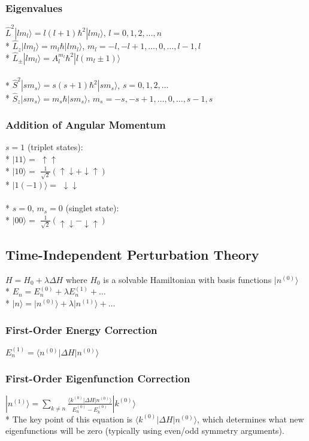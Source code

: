\subsubsection{Eigenvalues}
\(\hat{L}^2|lm_l\rangle=l(l+1)\hbar^2|lm_l\rangle\), \(l=0,1,2,\ldots,n\)\\*
\(\hat{L}_z|lm_l\rangle=m_l\hbar|lm_l\rangle\), \(m_l=-l,-l+1,\ldots,0,\ldots,l-1,l\)\\*
\(\hat{L}_\pm|lm_l\rangle=A_l^{m_l}\hbar^2|l(m_l\pm 1)\rangle\)\\\\*
\(\hat{S}^2|sm_s\rangle=s(s+1)\hbar^2|sm_s\rangle\), \(s=0,1,2,\ldots\)\\*
\(\hat{S}_z|sm_s\rangle=m_s\hbar|sm_s\rangle\), \(m_s=-s,-s+1,\ldots,0,\ldots,s-1,s\)

\subsubsection{Addition of Angular Momentum}
\(s=1\) (triplet states):\\*
\(|11\rangle =\) \( \uparrow\uparrow\)\\*
\(|10\rangle =\) \(\frac{1}{\sqrt{2}}(\uparrow\downarrow+\downarrow\uparrow)\)\\*
\(|1(-1)\rangle =\) \(\downarrow\downarrow\)\\\\*
\(s=0\), \(m_s=0\) (singlet state):\\*
\(|00\rangle =\) \(\frac{1}{\sqrt{2}}(\uparrow\downarrow-\downarrow\uparrow)\)

\subsection{Time-Independent Perturbation Theory}
\(H=H_0+\lambda\Delta H\) where \(H_0\) is a solvable Hamiltonian with basis functions \(|n^{(0)}\rangle\)\\*
\(E_n=E_n^{(0)}+\lambda E_n^{(1)}+\ldots\)\\*
\(|n\rangle=|n^{(0)}\rangle+\lambda |n^{(1)}\rangle+\ldots\)

\subsubsection{First-Order Energy Correction}
\(E_n^{(1)}=\langle n^{(0)}|\Delta H|n^{(0)}\rangle\)

\subsubsection{First-Order Eigenfunction Correction}
\(\displaystyle |n^{(1)}\rangle=\sum_{k\neq n}\frac{\langle k^{(0)}|\Delta H|n^{(0)}\rangle}{E_n^{(0)}-E_k^{(0)}}|k^{(0)}\rangle\)\\*
The key point of this equation is \(\langle k^{(0)}|\Delta H|n^{(0)}\rangle\), which determines what new eigenfunctions will be zero (typically using even/odd symmetry arguments).
